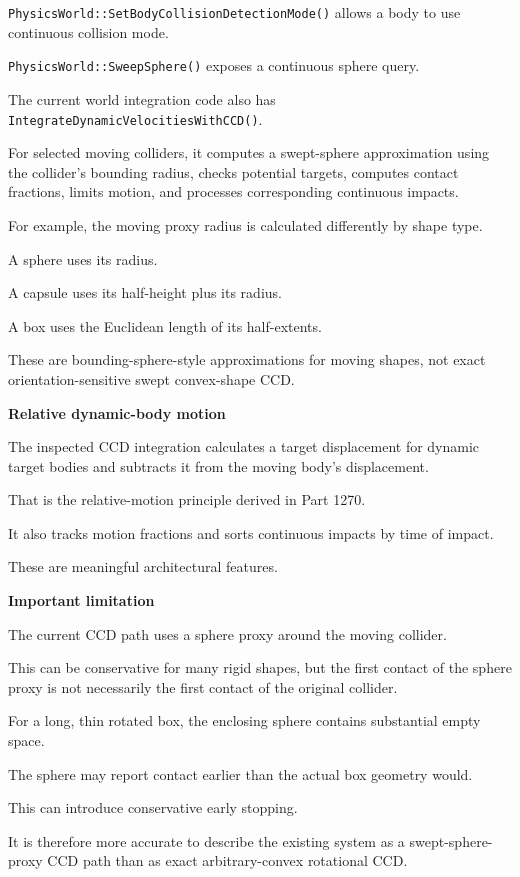 \texttt{PhysicsWorld::SetBodyCollisionDetectionMode()} allows a body to use continuous collision mode.

\texttt{PhysicsWorld::SweepSphere()} exposes a continuous sphere query.

The current world integration code also has \texttt{IntegrateDynamicVelocitiesWithCCD()}.

For selected moving colliders, it computes a swept-sphere approximation using the collider's bounding radius, checks potential targets, computes contact fractions, limits motion, and processes corresponding continuous impacts.

For example, the moving proxy radius is calculated differently by shape type.

A sphere uses its radius.

A capsule uses its half-height plus its radius.

A box uses the Euclidean length of its half-extents.

These are bounding-sphere-style approximations for moving shapes, not exact orientation-sensitive swept convex-shape CCD.

\textbf{Relative dynamic-body motion}

The inspected CCD integration calculates a target displacement for dynamic target bodies and subtracts it from the moving body's displacement.

That is the relative-motion principle derived in Part 1270.

It also tracks motion fractions and sorts continuous impacts by time of impact.

These are meaningful architectural features.

\textbf{Important limitation}

The current CCD path uses a sphere proxy around the moving collider.

This can be conservative for many rigid shapes, but the first contact of the sphere proxy is not necessarily the first contact of the original collider.

For a long, thin rotated box, the enclosing sphere contains substantial empty space.

The sphere may report contact earlier than the actual box geometry would.

This can introduce conservative early stopping.

It is therefore more accurate to describe the existing system as a swept-sphere-proxy CCD path than as exact arbitrary-convex rotational CCD.


